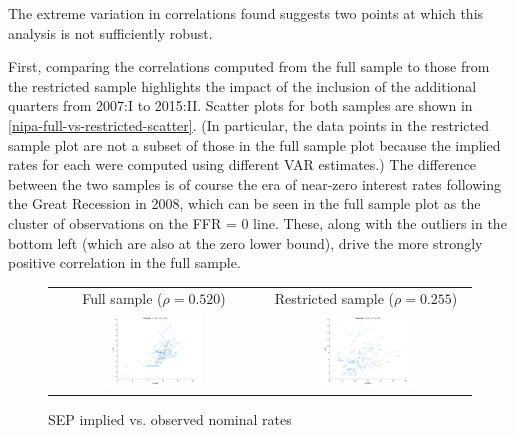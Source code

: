The extreme variation in correlations found suggests two points at which this analysis is not sufficiently robust.

First, comparing the correlations computed from the full sample to those from the restricted sample highlights the impact of the inclusion of the additional quarters from 2007:I to 2015:II. Scatter plots for both samples are shown in \autoref{nipa-full-vs-restricted-scatter}. (In particular, the data points in the restricted sample plot are not a subset of those in the full sample plot because the implied rates for each were computed using different VAR estimates.) The difference between the two samples is of course the era of near-zero interest rates following the Great Recession in 2008, which can be seen in the full sample plot as the cluster of observations on the FFR = 0 line. These, along with the outliers in the bottom left (which are also at the zero lower bound), drive the more strongly positive correlation in the full sample.

\begin{figure}[t]
\centering
\begin{tabular}{cc}
Full sample ($\rho = 0.520$) & Restricted sample ($\rho = 0.255$) \\
\includegraphics[width=0.49\textwidth]{figs/nipa/scatter/nominal_sep} &
\includegraphics[width=0.49\textwidth]{figs/nipa/scatter/nominal_sep_collard} \\
\end{tabular}
\caption{SEP implied vs. observed nominal rates}
\label{nipa-full-vs-restricted-scatter}
\end{figure}


